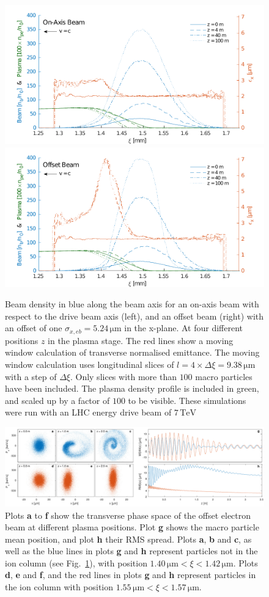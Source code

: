 \documentclass[aps,prstab,reprint,amsmath,amssymb,groupedaddress]{revtex4-1}
\newcommand{\unit}[1]{\,\mathrm{#1}}
\begin{document}
\begin{figure}[hbt]
    \includegraphics[width=0.495\linewidth,trim={2mm 0mm 2mm 0mm},clip]{figures/beamEmittance}
    \includegraphics[width=0.495\linewidth,trim={2mm 0mm 2mm 0mm},clip]{figures/beamEmittanceOffset}
    \caption{\label{Fig:BeamEmitt} Beam density in blue along the beam axis for an on-axis beam with respect to the
        drive beam axis (left), and an offset beam (right) with an offset of one $\sigma_{x,eb} = 5.24\unit{\mu m}$ in
        the x-plane. At four different positions $z$ in the plasma stage. The red lines show a moving window calculation
        of transverse normalised emittance. The moving window calculation uses longitudinal slices of
        $l = 4\times\Delta\xi = 9.38\unit{\mu m}$ with a step of $\Delta\xi$. Only slices with more than $100$ macro
        particles have been included. The plasma density profile is included in green, and scaled up by a factor of
        $100$ to be visible. These simulations were run with an LHC energy drive beam of $7\unit{TeV}$}
\end{figure}

\begin{figure}[hbt]
    \includegraphics[width=\linewidth,trim={0mm 0mm 0mm 0mm},clip]{figures/beamFilamentationAll}
    \caption{\label{Fig:BeamFilament} Plots \textbf{a} to \textbf{f} show the transverse phase space of the offset
        electron beam at different plasma positions. Plot \textbf{g} shows the macro particle mean position, and plot
        \textbf{h} their RMS spread. Plots \textbf{a}, \textbf{b} and \textbf{c}, as well as the blue lines in plots
        \textbf{g} and \textbf{h} represent particles not in the ion column (see Fig.~\ref{Fig:BeamEmitt}), with
        position $1.40\unit{\mu m} < \xi < 1.42\unit{\mu m}$. Plots \textbf{d}, \textbf{e} and \textbf{f}, and the red
        lines in plots \textbf{g} and \textbf{h} represent particles in the ion column with position
        $1.55\unit{\mu m} < \xi < 1.57\unit{\mu m}$.}
\end{figure}
\end{document}

